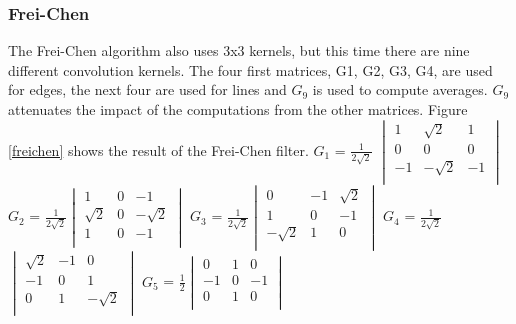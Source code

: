 \documentclass[12pt]{article}
\begin{document}
\subsubsection{Frei-Chen}
 The Frei-Chen algorithm also uses 3x3 kernels, but this time there are nine different convolution kernels. The four first matrices, G1, G2, G3, G4, are used for edges, the next four are used for lines and $G_9$ is used to compute averages. $G_9$ attenuates the impact of the computations from the other matrices. Figure \ref{freichen} shows the result of the Frei-Chen filter.
\newline
\newline
 $G_1$ = $\frac{1}{2\sqrt2}$ $\begin{vmatrix}
        1 & \sqrt2 & 1\\
        0 & 0 & 0\\
        -1 & -\sqrt2 & -1\\
\end{vmatrix}$\hspace{5mm}
$G_2$ = $\frac{1}{2\sqrt2}$$\begin{vmatrix}
        1 & 0 & -1\\
        \sqrt2 & 0 & -\sqrt2\\
        1 & 0 & -1\\
\end{vmatrix}$\hspace{5mm}
$G_3$ = $\frac{1}{2\sqrt2}$$\begin{vmatrix}
        0 & -1 & \sqrt2\\
        1 & 0 & -1\\
        -\sqrt2 & 1 & 0\\
\end{vmatrix}$\hspace{5mm}
\newline
$G_4$ = $\frac{1}{2\sqrt2}$$\begin{vmatrix}
        \sqrt2 & -1 & 0\\
        -1 & 0 & 1\\
        0 & 1 & -\sqrt2\\
\end{vmatrix}$\hspace{5mm}
$G_5$ = $\frac{1}{2}$$\begin{vmatrix}
        0 & 1 & 0\\
        -1 & 0 & -1\\
        0 & 1 & 0\\
\end{vmatrix}$\hspace{10mm}
\end{document}

